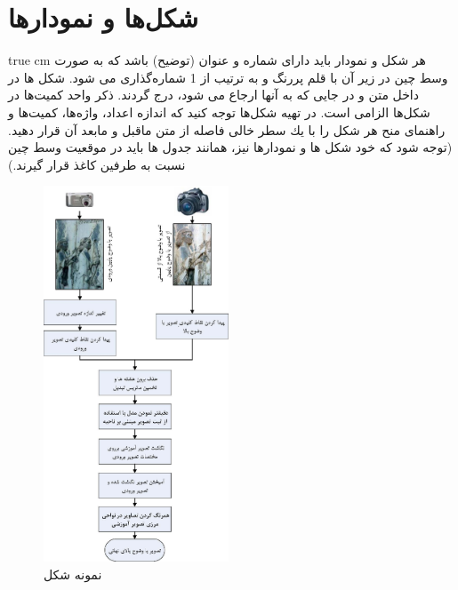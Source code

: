 \documentclass[11pt, twoside]{imsproc}
\begin{document}
\section{شكل‌ها و نمودارها}
 true cm
هر شكل و نمودار بايد دارای شماره و عنوان (توضيح) باشد كه به صورت وسط چين در زير آن با قلم پررنگ  و به ترتيب از 1 شماره‌گذاری می شود. شكل ‌ها در داخل متن و در جايی كه به آنها ارجاع می شود، درج گردند. ذكر واحد كميت‌ها در شكل‌ها الزامی است. در تهيه شكل‌ها توجه كنيد كه اندازه اعداد، واژه‌ها، كميت‌ها و راهنمای منح هر شكل را با يك سطر خالی فاصله از متن ماقبل و مابعد آن قرار دهيد. (توجه شود كه خود شكل ها و نمودارها نيز، همانند جدول ها بايد در موقعيت وسط چين نسبت به طرفين كاغذ قرار گيرند.)
\\
\begin{figure}[ht]
\centering
\includegraphics[width=55mm]{Fig-1} 
\caption{\label{shir}\small نمونه شكل }
\end{figure}


\bigskip
\bigskip 
\end{document}
